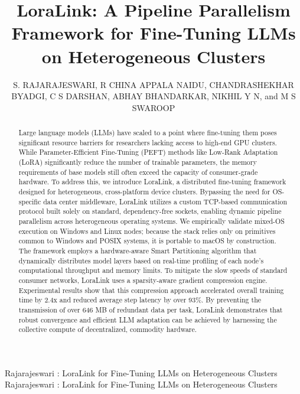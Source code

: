 \documentclass{ieeeaccess}
\begin{document}

\title{LoraLink: A Pipeline Parallelism Framework for Fine-Tuning LLMs on Heterogeneous Clusters}
\author{\uppercase{S. Rajarajeswari},
\uppercase{R China Appala Naidu},
\uppercase{Chandrashekhar Byadgi},
\uppercase{C S Darshan},
\uppercase{Abhay Bhandarkar},
\uppercase{Nikhil Y N},
and \uppercase{M S Swaroop}}

\address[1]{Department of Computer Science and Engineering, Ramaiah Institute of Technology, Bengaluru, India}
\address[2]{Samsung R\&D Institute Bengaluru, Bengaluru, India}

\markboth
{Rajarajeswari \headeretal: LoraLink for Fine-Tuning LLMs on Heterogeneous Clusters}
{Rajarajeswari \headeretal: LoraLink for Fine-Tuning LLMs on Heterogeneous Clusters}


\begin{abstract}
Large language models (LLMs) have scaled to a point where fine-tuning them poses significant resource barriers for researchers lacking access to high-end GPU clusters. While Parameter-Efficient Fine-Tuning (PEFT) methods like Low-Rank Adaptation (LoRA) significantly reduce the number of trainable parameters, the memory requirements of base models still often exceed the capacity of consumer-grade hardware. To address this, we introduce LoraLink, a distributed fine-tuning framework designed for heterogeneous, cross-platform device clusters. Bypassing the need for OS-specific data center middleware, LoraLink utilizes a custom TCP-based communication protocol built solely on standard, dependency-free sockets, enabling dynamic pipeline parallelism across heterogeneous operating systems. We empirically validate mixed-OS execution on Windows and Linux nodes; because the stack relies only on primitives common to Windows and POSIX systems, it is portable to macOS by construction. The framework employs a hardware-aware Smart Partitioning algorithm that dynamically distributes model layers based on real-time profiling of each node's computational throughput and memory limits. To mitigate the slow speeds of standard consumer networks, LoraLink uses a sparsity-aware gradient compression engine. Experimental results show that this compression approach accelerated overall training time by 2.4x and reduced average step latency by over 93\%. By preventing the transmission of over 646 MB of redundant data per task, LoraLink demonstrates that robust convergence and efficient LLM adaptation can be achieved by harnessing the collective compute of decentralized, commodity hardware.
\end{abstract}
\end{document}
